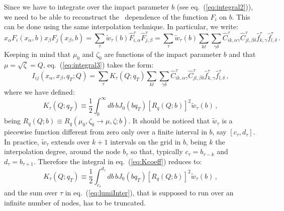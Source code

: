 \documentclass[10pt,a4paper]{article}
\begin{document}
Since we have to integrate over the impact parameter $b$ (see
eq.~(\ref{eq:integral2})), we need to be able to reconstruct the \
dependence of the function $F_i$ on $b$. This can be done using the
same interpolation technique. In particular, we write:
\begin{equation}
  x_\alpha F_i(x_{\alpha},b)
  x_\beta F_j(x_\beta,b) = 
  \sum_\tau \widetilde{w}_{\tau}(b) \hat{F}_{i,\alpha}^\tau \hat{F}_{j,\beta}^\tau
  = \sum_\tau \widetilde{w}_{\tau}(b) \sum_{kl}\sum_{\gamma\delta} \hat{C}_{ik,\alpha\gamma}^\tau
  \hat{C}_{jl,\beta\delta}^\tau \hat{f}_{k,\gamma}^\tau \hat{f}_{l,\delta}^\tau\,.
\end{equation}
Keeping in mind that $\mu_0$ and $\zeta_0$ are functions of the impact
parameter $b$ and that $\mu=\sqrt{\zeta} =Q$, eq.~(\ref{eq:integral3})
takes the form:
\begin{equation}\label{eq:lumiInter}
  I_{ij}(x_\alpha,x_\beta,q_T;Q)= \sum_\tau K_\tau(Q;q_T)
  \sum_{kl}\sum_{\gamma\delta} \hat{C}_{ik,\alpha\gamma}^\tau
  \hat{C}_{jl,\beta\delta}^\tau \hat{f}_{k,\gamma}^\tau \hat{f}_{l,\delta}^\tau\,,
\end{equation}
where we have defined:
\begin{equation}\label{eq:Kcoeff}
  K_\tau(Q;q_T)\equiv\frac12\int_0^\infty db\,b J_0(bq_T)
  \left[R_q(Q;b)\right]^2 \widetilde{w}_{\tau}(b)\,,
\end{equation}
being $R_q(Q;b)\equiv R_q(\mu_0,\zeta_0\rightarrow \mu,\zeta;b)$. It
should be noticed that $\widetilde{w}_{\tau}$ is a piecewise function
different from zero only over a finite interval in $b$, say
$[c_\tau,d_\tau]$. In practice, $\widetilde{w}_{\tau}$ extends over
$k+1$ intervals on the grid in $b$, being $k$ the interpolation
degree, around the node $b_\tau$ so that, typically
$c_\tau=b_{\tau-k}$ and $d_\tau=b_{\tau+1}$. Therefore the integral in
eq.~(\ref{eq:Kcoeff}) reduces to:
\begin{equation}\label{eq:Kcoeff1}
  K_\tau(Q;q_T)\equiv\frac12\int_{c_\tau}^{d_\tau} db\,b J_0(bq_T)
  \left[R_q(Q;b)\right]^2 \widetilde{w}_{\tau}(b)\,,
\end{equation}
and the sum over $\tau$ in eq.~(\ref{eq:lumiInter}), that is supposed
to run over an infinite number of nodes, has to be truncated.
\end{document}
